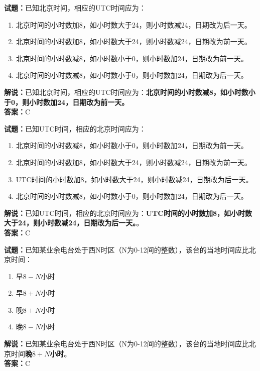 \documentclass{ctexbook}
\begin{document}
\vspace{1em}

\textbf{试题：}已知北京时间，相应的UTC时间应为：
\begin{enumerate}[leftmargin=3em]
  \item 北京时间的小时数加8，如小时数大于24，则小时数减24，日期改为后一天。
  \item 北京时间的小时数加8，如小时数大于24，则小时数减24，日期改为前一天。
  \item 北京时间的小时数减8，如小时数小于0，则小时数加24，日期改为前一天。
  \item 北京时间的小时数减8，如小时数小于0，则小时数加24，日期改为后一天。
\end{enumerate}
\noindent\textbf{解说：}已知北京时间，相应的UTC时间应为：\textbf{北京时间的小时数减8，如小时数小于0，则小时数加24，日期改为前一天。}\\\noindent\textbf{答案：}C

\vspace{1em}

\textbf{试题：}已知UTC时间，相应的北京时间应为：
\begin{enumerate}[leftmargin=3em]
  \item 北京时间的小时数减8，如小时数小于0，则小时数加24，日期改为前一天。
  \item 北京时间的小时数加8，如小时数大于24，则小时数减24，日期改为前一天。
  \item UTC时间的小时数加8，如小时数大于24，则小时数减24，日期改为后一天。
  \item 北京时间的小时数减8，如小时数小于0，则小时数加24，日期改为后一天。
\end{enumerate}
\noindent\textbf{解说：}已知UTC时间，相应的北京时间应为：\textbf{UTC时间的小时数加8，如小时数大于24，则小时数减24，日期改为后一天。}。\\\noindent\textbf{答案：}C

\vspace{1em}

\textbf{试题：}已知某业余电台处于西N时区（N为0-12间的整数），该台的当地时间应比北京时间：
\begin{enumerate}[leftmargin=3em]
  \item 早\(8-N\)小时
  \item 早\(8+N\)小时
  \item 晚\(8+N\)小时
  \item 晚\(8-N\)小时
\end{enumerate}
\noindent\textbf{解说：}已知某业余电台处于西N时区（N为0-12间的整数），该台的当地时间应比北京时间\textbf{晚\(8+N\)小时}。\\\noindent\textbf{答案：}C
\end{document}

